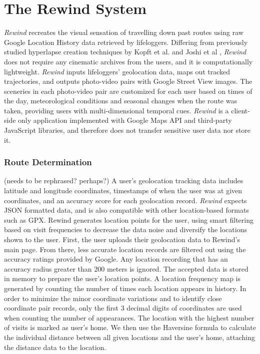 \documentclass{sigchi}
\begin{document}
\section{The Rewind System}
\textit{Rewind} recreates the visual sensation of travelling down past routes using raw Google Location History data retrieved by lifeloggers. Differing from previously studied hyperlapse creation techniques by Kopft et al. and Joshi et al \cite{Kopf:2014:FHV:2601097.2601195, Joshi:2015:RHC:2809654.2766954}, \textit{Rewind} does not require any cinematic archives from the users, and it is computationally lightweight. \textit{Rewind} inputs lifeloggers' geolocation data, maps out tracked trajectories, and outputs photo-video pairs with Google Street View images. The sceneries in each photo-video pair are customized for each user based on times of the day, meteorological conditions and seasonal changes when the route was taken, providing users with multi-dimensional temporal cues. \textit{Rewind} is a client-side only application implemented with Google Maps API and third-party JavaScript libraries, and therefore does not transfer sensitive user data nor store it. %


\subsubsection{Route Determination} (needs to be rephrased? perhaps?)
A user's geolocation tracking data includes latitude and longitude coordinates, timestamps of when the user was at given coordinates, and an accuracy score for each geolocation record. \textit{Rewind} expects JSON formatted data, and is also compatible with other location-based formats such as GPX. Rewind generates location points for the user, using smart filtering based on visit frequencies to decrease the data noise and diversify the locations shown to the user. First, the user uploads their geolocation data to Rewind's main page. From there, less accurate location records are filtered out using the accuracy ratings provided by Google. Any location recording that has an accuracy radius greater than 200 meters is ignored. The accepted data is stored in memory to prepare the user's location points. A location frequency map is generated by counting the number of times each location appears in history. In order to minimize the minor coordinate variations and to identify close coordinate pair records, only the first 3 decimal digits of coordinates are used when counting the number of appearances. The location with the highest number of visits is marked as user's home. We then use the Haversine formula to calculate the individual distance between all given locations and the user's home, attaching the distance data to the location.
\end{document}
